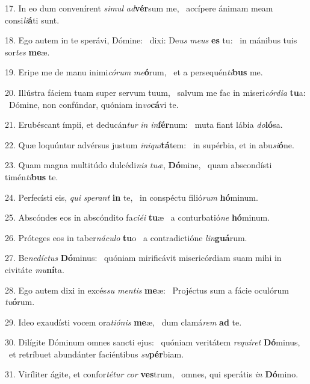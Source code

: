 17. In eo dum convenírent \textit{si}\textit{mul} \textit{ad}\textbf{vér}sum me, \ast\  accípere ánimam meam consi\textit{li}\textbf{á}ti sunt.\

18. Ego autem in te sperávi, Dómine: \dag\  dixi: De\textit{us} \textit{me}\textit{us} \textbf{es} tu: \ast\  in mánibus tuis sor\textit{tes} \textbf{me}æ.\

19. Eripe me de manu inimi\textit{có}\textit{rum} \textit{me}\textbf{ó}rum, \ast\  et a persequén\textit{ti}\textbf{bus} me.\

20. Illústra fáciem tuam super servum tuum, \dag\  salvum me fac in miseri\textit{cór}\textit{di}\textit{a} \textbf{tu}a: \ast\  Dómine, non confúndar, quóniam in\textit{vo}\textbf{cá}vi te.\

21. Erubéscant ímpii, et deducán\textit{tur} \textit{in} \textit{in}\textbf{fér}num: \ast\  muta fiant lábia \textit{do}\textbf{ló}sa.\

22. Quæ loquúntur advérsus justum \textit{in}\textit{i}\textit{qui}\textbf{tá}tem: \ast\  in supérbia, et in abu\textit{si}\textbf{ó}ne.\

23. Quam magna multitúdo dulcédi\textit{nis} \textit{tu}\textit{æ}, \textbf{Dó}mine, \ast\  quam abscondísti timén\textit{ti}\textbf{bus} te.\

24. Perfecísti eis, \textit{qui} \textit{spe}\textit{rant} \textbf{in} te, \ast\  in conspéctu filió\textit{rum} \textbf{hó}minum.\

25. Abscóndes eos in abscóndito fa\textit{ci}\textit{é}\textit{i} \textbf{tu}æ \ast\  a conturbatió\textit{ne} \textbf{hó}minum.\

26. Próteges eos in taber\textit{ná}\textit{cu}\textit{lo} \textbf{tu}o \ast\  a contradictióne \textit{lin}\textbf{guá}rum.\

27. Be\textit{ne}\textit{díc}\textit{tus} \textbf{Dó}minus: \ast\  quóniam mirificávit misericórdiam suam mihi in civitáte \textit{mu}\textbf{ní}ta.\

28. Ego autem dixi in excés\textit{su} \textit{men}\textit{tis} \textbf{me}æ: \ast\  Projéctus sum a fácie oculórum \textit{tu}\textbf{ó}rum.\

29. Ideo exaudísti vocem ora\textit{ti}\textit{ó}\textit{nis} \textbf{me}æ, \ast\  dum clamá\textit{rem} \textbf{ad} te.\

30. Dilígite Dóminum omnes sancti ejus: \dag\  quóniam veritátem \textit{re}\textit{quí}\textit{ret} \textbf{Dó}minus, \ast\  et retríbuet abundánter faciéntibus \textit{su}\textbf{pér}biam.\

31. Viríliter ágite, et confor\textit{té}\textit{tur} \textit{cor} \textbf{ves}trum, \ast\  omnes, qui sperátis \textit{in} \textbf{Dó}mino.\


